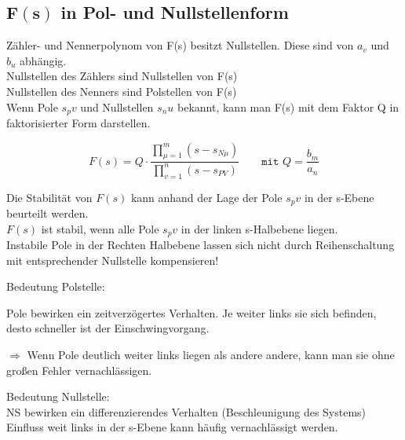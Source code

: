 \subsection{$\mathbf{F(s)}$ in Pol- und Nullstellenform}
\begin{mdframed}[style=exercise]
	Zähler- und Nennerpolynom von F(s) besitzt Nullstellen. Diese sind von
	$a_v$ und $b_u$ abhängig.\\
	Nullstellen des Zählers sind Nullstellen von F(s)\\
	Nullstellen des Nenners sind Polstellen von F(s)\\
	Wenn Pole $s_pv$ und Nullstellen $s_nu$ bekannt, kann man F(s) mit dem
	Faktor Q in faktorisierter Form darstellen.
\end{mdframed}

\[
	F(s)=Q \cdot \frac{\prod_{\mu=1}^{m}\left(s-s_{N \mu}\right)}{\prod_{v=1}^{n}\left(s-s_{P V}\right)}
	\qquad \texttt{mit } Q = \frac{b_m}{a_n}
\]

\begin{mdframed}[style=exercise]
	Die Stabilität von $F(s)$ kann anhand der Lage der Pole $s_pv$ in der s-Ebene
	beurteilt werden.\\ $F(s)$ ist stabil, wenn alle Pole $s_pv$ in der linken
	s-Halbebene liegen.\\ Instabile Pole in der Rechten Halbebene lassen sich
	nicht durch Reihenschaltung mit entsprechender Nullstelle kompensieren!
\end{mdframed}
\begin{mdframed}[style=exercise]
	Bedeutung Polstelle:

	Pole bewirken ein zeitverzögertes Verhalten. Je weiter links sie sich befinden,
	desto schneller ist der Einschwingvorgang.

	$\Rightarrow$ Wenn Pole deutlich weiter links liegen als andere andere, kann man sie ohne
	großen Fehler vernachlässigen.
\end{mdframed}
\begin{mdframed}[style=exercise]
	Bedeutung Nullstelle:\\
	NS bewirken ein differenzierendes Verhalten (Beschleunigung des Systems)
	Einfluss weit links in der s-Ebene kann häufig vernachlässigt werden.

\end{mdframed}

